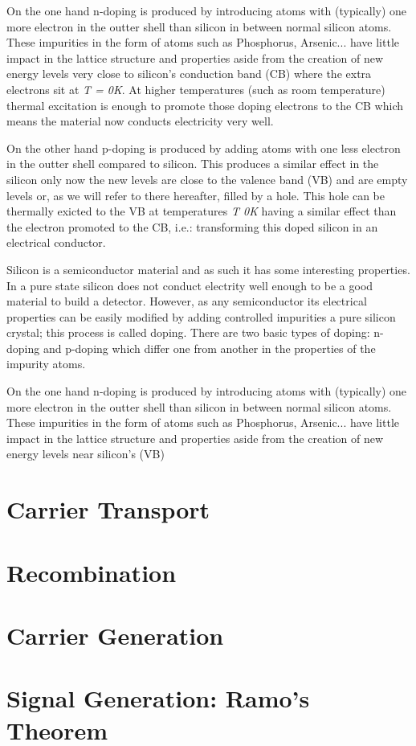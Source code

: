 On the one hand n-doping is produced by introducing atoms with (typically) one more electron in the outter shell than silicon in between normal silicon atoms. These impurities in the form of atoms such as Phosphorus, Arsenic... have little impact in the lattice structure and properties aside from the creation of new energy levels very close to silicon’s conduction band (CB) where the extra electrons sit at \textit{T = 0K}. At higher temperatures (such as room temperature) thermal excitation is enough to promote those doping electrons to the CB which means the material now conducts electricity very well.

On the other hand p-doping is produced by adding atoms with one less electron in the outter shell compared to silicon. This produces a similar effect in the silicon only now the new levels are close to the valence band (VB) and are empty levels or, as we will refer to there hereafter, filled by a hole. This hole can be thermally exicted to the VB at temperatures \textit{T \beq 0K} having a similar effect than the electron promoted to the CB, i.e.: transforming this doped silicon in an electrical conductor.

Silicon is a semiconductor material and as such it has some interesting properties. In a pure state silicon does not conduct electrity well enough to be a good material to build a detector. However, as any semiconductor its electrical properties can be easily modified by adding controlled impurities a pure silicon crystal; this process is called doping. There are two basic types of doping: n-doping and p-doping which differ one from another in the properties of the impurity atoms.

On the one hand n-doping is produced by introducing atoms with (typically) one more electron in the outter shell than silicon in between normal silicon atoms. These impurities in the form of atoms such as Phosphorus, Arsenic... have little impact in the lattice structure and properties aside from the creation of new energy levels near silicon's (VB)

\section{Carrier Transport}


\section{Recombination} 

\section{Carrier Generation}

\section{Signal Generation: Ramo's Theorem} %

